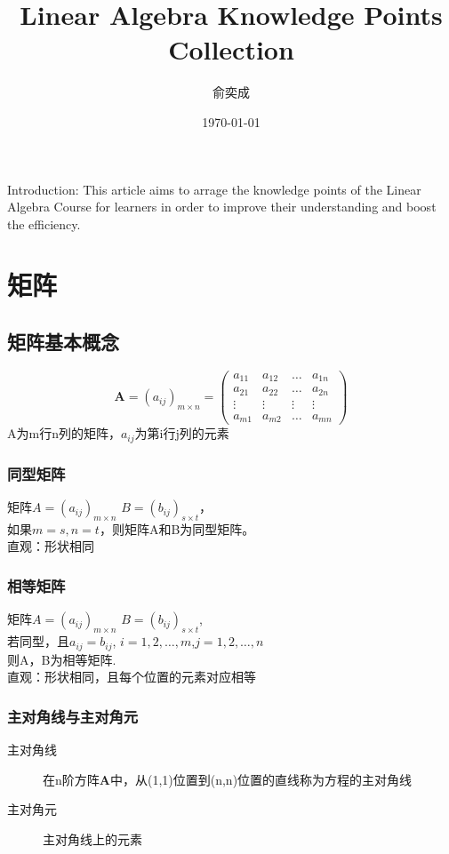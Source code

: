 \documentclass[12pt,oneside]{ctexbook}
\begin{document}
\title{Linear Algebra Knowledge Points Collection}
\author{\kaishu 俞奕成}
\date{\kaishu \today}

\maketitle

Introduction: This article aims to arrage the knowledge points of the Linear Algebra Course for learners in order to improve their understanding and boost the efficiency.
\setcounter{tocdepth}{2}
\tableofcontents

\newpage

\part{矩阵}

\chapter{矩阵基本概念}
\[\mathbf{A}=(a_{ij})_{m\times n}=
\begin{pmatrix}
    a_{11}&a_{12}&\dots&a_{1n}
    \\a_{21}&a_{22}&\dots&a_{2n}
    \\ \vdots &\vdots &\vdots &\vdots
    \\a_{m1}&a_{m2}&\dots&a_{mn}
\end{pmatrix}\]
A为m行n列的矩阵，\(a_{ij}\)为第i行j列的元素

\section{同型矩阵}
\kaishu
矩阵\(A=(a_{ij})_{m\times n}\) \(B=(b_{ij})_{s\times t}\)，\\如果\(m=s,n=t\)，则矩阵A和B为同型矩阵。
\\直观：形状相同

\section{相等矩阵}
\kaishu
矩阵\(A=(a_{ij})_{m\times n}\) \(B=(b_{ij})_{s\times t}\),\\
若同型，且\(a_{ij}=b_{ij}\), \(i=1,2,\dots ,m\),\(j=1,2,\dots ,n\)
\\则A，B为相等矩阵.
\\直观：形状相同，且每个位置的元素对应相等

\section{主对角线与主对角元}
\begin{description}
    \item[主对角线] \kaishu 在n阶方阵\(\mathbf{A}\)中，从(1,1)位置到(n,n)位置的直线称为方程的主对角线
    \item[主对角元] \kaishu 主对角线上的元素
\end{description}
\end{document}
